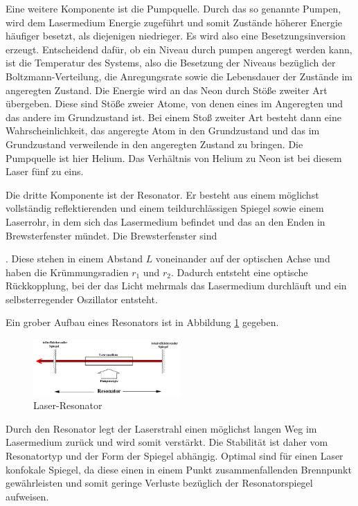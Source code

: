 \noindent Eine weitere Komponente ist die Pumpquelle. Durch das so genannte Pumpen, wird dem Lasermedium Energie zugeführt und somit Zustände höherer Energie häufiger besetzt, als diejenigen niedrieger. Es wird also eine Besetzungsinversion erzeugt. Entscheidend dafür, ob ein Niveau durch pumpen angeregt werden kann, ist die Temperatur des Systems, also die Besetzung der Niveaus bezüglich der Boltzmann-Verteilung, die Anregungsrate sowie die Lebensdauer der Zustände im angeregten Zustand. Die Energie wird an das Neon durch Stöße zweiter Art übergeben. Diese sind Stöße zweier Atome, von denen eines im Angeregten und das andere im Grundzustand ist. Bei einem Stoß zweiter Art besteht dann eine Wahrscheinlichkeit, das angeregte Atom in den Grundzustand und das im Grundzustand verweilende in den angeregten Zustand zu bringen. Die Pumpquelle ist hier Helium. Das Verhältnis von Helium zu Neon ist bei diesem Laser fünf zu eins.

\noident Die dritte Komponente ist der Resonator. Er besteht aus einem möglichst vollständig reflektierenden und einem teildurchlässigen Spiegel sowie einem Laserrohr, in dem sich das Lasermedium befindet und das an den Enden in Brewsterfenster mündet. Die Brewsterfenster sind 


. Diese stehen in einem Abstand \(L\)  voneinander auf der optischen Achse und haben die Krümmungsradien \(r_1\) und \(r_2\). Dadurch entsteht eine optische Rückkopplung, bei der das Licht mehrmals das Lasermedium durchläuft und ein selbsterregender Oszillator entsteht. 

\noindent Ein grober Aufbau eines Resonators ist in Abbildung \ref{fig:hene1} gegeben.

\begin{figure}
	\centering
		\includegraphics[width=0.5\textwidth]{hene1.png}
	\caption{Laser-Resonator}
	\label{fig:hene1}
\end{figure}

\noindent Durch den Resonator legt der Laserstrahl einen möglichst langen Weg im Lasermedium zurück und wird somit verstärkt. Die Stabilität ist daher vom Resonatortyp und der Form der Spiegel abhängig. Optimal sind für einen Laser konfokale Spiegel, da diese einen in einem Punkt zusammenfallenden Brennpunkt gewährleisten und somit geringe Verluste bezüglich der Resonatorspiegel aufweisen.

